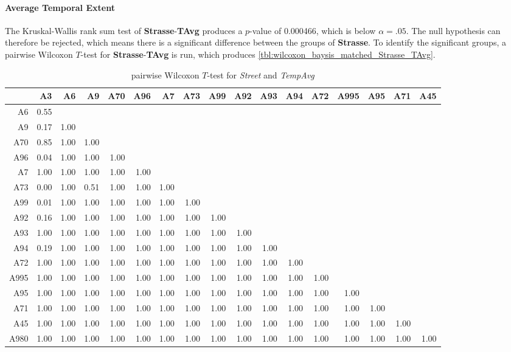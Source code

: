 \paragraph{Average Temporal Extent}
The Kruskal-Wallis rank sum test of \textbf{Strasse}-\textbf{TAvg} produces a $p$-value of 0.000466, which is below $\alpha=.05$. The null hypothesis can therefore be rejected, which means there is a significant difference between the groups of \textbf{Strasse}. To identify the significant groups, a pairwise Wilcoxon $T$-test for \textbf{Strasse}-\textbf{TAvg} is run, which produces \autoref{tbl:wilcoxon_baysis_matched_Strasse_TAvg}. 
\begin{table}[ht]
	\tiny
	\setlength{\tabcolsep}{4pt}
	\centering
	\begin{tabular}{rrrrrrrrrrrrrrrrr}
		\toprule
				& A3 & A6 & A9 & A70 & A96 & A7 & A73 & A99 & A92 & A93 & A94 & A72 & A995 & A95 & A71 & A45 \\ 
		\midrule
		A6 		& 0.55 &  &  &  &  &  &  &  &  &  &  &  &  &  &  &  \\ 
		A9 		& 0.17 & 1.00 &  &  &  &  &  &  &  &  &  &  &  &  &  &  \\ 
		A70		& 0.85 & 1.00 & 1.00 &  &  &  &  &  &  &  &  &  &  &  &  &  \\ 
		A96 	& 0.04 & 1.00 & 1.00 & 1.00 &  &  &  &  &  &  &  &  &  &  &  &  \\ 
		A7 		& 1.00 & 1.00 & 1.00 & 1.00 & 1.00 &  &  &  &  &  &  &  &  &  &  &  \\ 
		A73 	& 0.00 & 1.00 & 0.51 & 1.00 & 1.00 & 1.00 &  &  &  &  &  &  &  &  &  &  \\ 
		A99 	& 0.01 & 1.00 & 1.00 & 1.00 & 1.00 & 1.00 & 1.00 &  &  &  &  &  &  &  &  &  \\ 
		A92 	& 0.16 & 1.00 & 1.00 & 1.00 & 1.00 & 1.00 & 1.00 & 1.00 &  &  &  &  &  &  &  &  \\ 
		A93 	& 1.00 & 1.00 & 1.00 & 1.00 & 1.00 & 1.00 & 1.00 & 1.00 & 1.00 &  &  &  &  &  &  &  \\ 
		A94 	& 0.19 & 1.00 & 1.00 & 1.00 & 1.00 & 1.00 & 1.00 & 1.00 & 1.00 & 1.00 &  &  &  &  &  &  \\ 
		A72 	& 1.00 & 1.00 & 1.00 & 1.00 & 1.00 & 1.00 & 1.00 & 1.00 & 1.00 & 1.00 & 1.00 &  &  &  &  &  \\ 
		A995 	& 1.00 & 1.00 & 1.00 & 1.00 & 1.00 & 1.00 & 1.00 & 1.00 & 1.00 & 1.00 & 1.00 & 1.00 &  &  &  &  \\ 
		A95 	& 1.00 & 1.00 & 1.00 & 1.00 & 1.00 & 1.00 & 1.00 & 1.00 & 1.00 & 1.00 & 1.00 & 1.00 & 1.00 &  &  &  \\ 
		A71		& 1.00 & 1.00 & 1.00 & 1.00 & 1.00 & 1.00 & 1.00 & 1.00 & 1.00 & 1.00 & 1.00 & 1.00 & 1.00 & 1.00 &  &  \\ 
		A45 	& 1.00 & 1.00 & 1.00 & 1.00 & 1.00 & 1.00 & 1.00 & 1.00 & 1.00 & 1.00 & 1.00 & 1.00 & 1.00 & 1.00 & 1.00 &  \\ 
		A980 	& 1.00 & 1.00 & 1.00 & 1.00 & 1.00 & 1.00 & 1.00 & 1.00 & 1.00 & 1.00 & 1.00 & 1.00 & 1.00 & 1.00 & 1.00 & 1.00 \\
		\bottomrule
	\end{tabular}
	\caption{pairwise Wilcoxon $T$-test for \textit{Street} and \textit{TempAvg}}
	\label{tbl:wilcoxon_baysis_matched_Strasse_TAvg}
\end{table}
